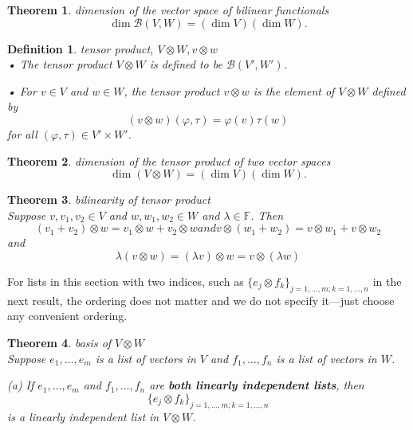 \documentclass{article}
\newtheorem{theorem}{Theorem}[subsection]
\newtheorem{definition}{Definition}[subsection]
\newcommand{\FF}{\mathbb{F}}
\begin{document}
\begin{CJK}{UTF8}{gkai}
\begin{theorem}
    dimension of the vector space of bilinear functionals\\

    \[\dim\mathcal{B}(V,W) = (\dim V)(\dim W).\]
\end{theorem}

\begin{definition}
    tensor product, $V \otimes W, v \otimes w$\\

    • The tensor product $V \otimes W$ is defined to be $\mathcal{B}(V',W')$.

    • For $v \in V$ and $w\in W$, the tensor product $v \otimes w$ is the element of $V \otimes W$ defined by
    \[(v \otimes w)(\varphi,\tau) = \varphi(v)\tau(w)\]
    for all $(\varphi,\tau) \in V'\times W'$.
\end{definition}

\begin{theorem}
    dimension of the tensor product of two vector spaces\\

    \[\dim(V\otimes W) = (\dim V)(\dim W).\]
\end{theorem}

\begin{theorem}
    bilinearity of tensor product\\

    Suppose $v,v_1,v_2 \in V$ and $w,w_1,w_2 \in W$ and $\lambda \in \FF$. Then
    \[(v_1 +v_2)\otimes w = v_1\otimes w+v_2\otimes w and v\otimes(w_1+w_2)=v\otimes w_1+v\otimes w_2\]
    and
    \[\lambda(v \otimes w) = (\lambda v)\otimes w =v \otimes(\lambda w)\]
\end{theorem}

For lists in this section with two indices, such as $\{e_j \otimes f_k\}_{j=1,\ldots,m;k=1,\ldots,n}$ in the next result, the ordering does not matter and we do not specify it—just choose any convenient ordering.

\begin{theorem}
    basis of $V\otimes W$\\

    Suppose $e_1,\ldots,e_m$ is a list of vectors in $V$ and $f_1,\ldots, f_n$ is a list of vectors in $W$.

    (a) If $e_1,\ldots,e_m$ and $f_1,\ldots, f_n$ are \textbf{both linearly independent lists}, then
    \[\{e_j \otimes f_k\}_{j=1,\ldots,m;k=1,\ldots,n}\]
    is a linearly independent list in $V\otimes W$.


\end{theorem}
\end{CJK}
\end{document}

